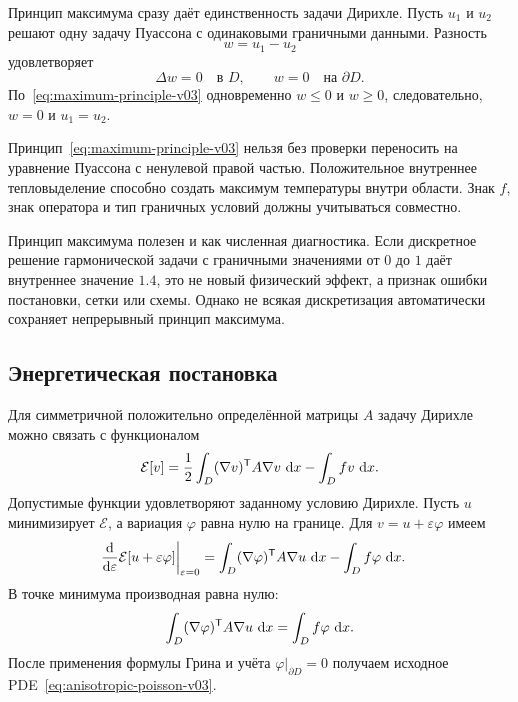 Принцип максимума сразу даёт единственность задачи Дирихле. Пусть $u_1$ и $u_2$ решают одну задачу Пуассона с одинаковыми граничными данными. Разность
\[
w=u_1-u_2
\]
удовлетворяет
\[
\Delta w=0
\quad\text{в }D,
\qquad
w=0
\quad\text{на }\partial D.
\]
По~\eqref{eq:maximum-principle-v03} одновременно $w\leq0$ и $w\geq0$, следовательно, $w=0$ и $u_1=u_2$.

\begin{caution}
Принцип~\eqref{eq:maximum-principle-v03} нельзя без проверки переносить на уравнение Пуассона с ненулевой правой частью. Положительное внутреннее тепловыделение способно создать максимум температуры внутри области. Знак $f$, знак оператора и тип граничных условий должны учитываться совместно.
\end{caution}

Принцип максимума полезен и как численная диагностика. Если дискретное решение гармонической задачи с граничными значениями от $0$ до $1$ даёт внутреннее значение $1.4$, это не новый физический эффект, а признак ошибки постановки, сетки или схемы. Однако не всякая дискретизация автоматически сохраняет непрерывный принцип максимума.

\subsection{Энергетическая постановка}

Для симметричной положительно определённой матрицы $A$ задачу Дирихле можно связать с функционалом
\begin{equation}
\label{eq:poisson-energy-v03}
\mathcal E[v]
=
\frac12
\int_D
(\nabla v)^{\mathsf{T}}A\nabla v\,\mathop{}\!\mathrm{d} x
-
\int_D f v\,\mathop{}\!\mathrm{d} x.
\end{equation}
Допустимые функции удовлетворяют заданному условию Дирихле. Пусть $u$ минимизирует $\mathcal E$, а вариация $\varphi$ равна нулю на границе. Для $v=u+\varepsilon\varphi$ имеем
\begin{align}
\left.
\frac{\mathop{}\!\mathrm{d}}{\mathop{}\!\mathrm{d}\varepsilon}
\mathcal E[u+\varepsilon\varphi]
\right|_{\varepsilon=0}
&=
\int_D
(\nabla\varphi)^{\mathsf{T}}A\nabla u\,\mathop{}\!\mathrm{d} x
-
\int_D f\varphi\,\mathop{}\!\mathrm{d} x.
\end{align}
В точке минимума производная равна нулю:
\begin{equation}
\label{eq:poisson-variational-preview-v03}
\int_D
(\nabla\varphi)^{\mathsf{T}}A\nabla u\,\mathop{}\!\mathrm{d} x
=
\int_D f\varphi\,\mathop{}\!\mathrm{d} x.
\end{equation}
После применения формулы Грина и учёта $\varphi|_{\partial D}=0$ получаем исходное PDE~\eqref{eq:anisotropic-poisson-v03}.

